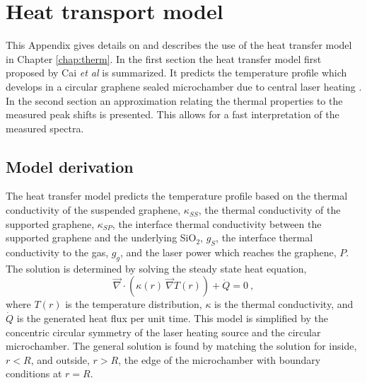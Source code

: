 \chapter{Heat transport model \label{chap:HTM}}
This Appendix gives details on and describes the use of the heat transfer model in Chapter \ref{chap:therm}.
In the first section the heat transfer model first proposed by Cai \textit{et al} is summarized.
It predicts the temperature profile which develops in a circular graphene sealed microchamber due to central laser heating \cite{Cai2010}.
In the second section an approximation relating the thermal properties to the measured peak shifts is presented.
This allows for a fast interpretation of the measured spectra.

\section{Model derivation}
The heat transfer model predicts the temperature profile based on the thermal conductivity of the suspended graphene, $\kappa_{SS}$, the thermal conductivity of the supported graphene, $\kappa_{SP}$, the interface thermal conductivity between the supported graphene and the underlying SiO$_2$, $g_S$, the interface thermal conductivity to the gas, $g_g$, and the laser power which reaches the graphene, $P$.
The solution is determined by solving the steady state heat equation,
\begin{equation*}
	\vec{\nabla} \cdot \left(\kappa(r) \ \vec{\nabla} T(r) \right) + \dot{Q}=0 \ ,
	\label{eq:HTM:heateq}
\end{equation*}
where $T(r)$ is the temperature distribution, $\kappa$ is the thermal conductivity, and $\dot{Q}$ is the generated heat flux per unit time.
This model is simplified by the concentric circular symmetry of the laser heating source and the circular microchamber.
The general solution is found by matching the solution for inside, $r<R$, and outside, $r>R$, the edge of the microchamber with boundary conditions at $r=R$.

